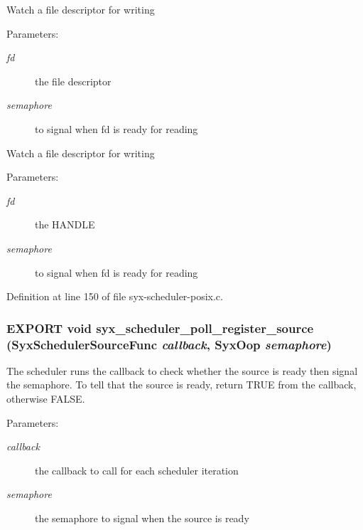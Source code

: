 Watch a file descriptor for writing

\begin{Desc}
\item[Parameters:]
\begin{description}
\item[{\em fd}]the file descriptor \item[{\em semaphore}]to signal when fd is ready for reading\end{description}
\end{Desc}
Watch a file descriptor for writing

\begin{Desc}
\item[Parameters:]
\begin{description}
\item[{\em fd}]the HANDLE \item[{\em semaphore}]to signal when fd is ready for reading \end{description}
\end{Desc}


Definition at line 150 of file syx-scheduler-posix.c.\hypertarget{syx-scheduler_8h_09ca1323cd03da2a2b4ad2223d940c9e}{
\subsubsection{\setlength{\rightskip}{0pt plus 5cm}EXPORT void syx\_\-scheduler\_\-poll\_\-register\_\-source ({\bf SyxSchedulerSourceFunc} {\em callback}, \/  {\bf SyxOop} {\em semaphore})}}
\label{syx-scheduler_8h_09ca1323cd03da2a2b4ad2223d940c9e}


The scheduler runs the callback to check whether the source is ready then signal the semaphore. To tell that the source is ready, return TRUE from the callback, otherwise FALSE.

\begin{Desc}
\item[Parameters:]
\begin{description}
\item[{\em callback}]the callback to call for each scheduler iteration \item[{\em semaphore}]the semaphore to signal when the source is ready \end{description}
\end{Desc}


